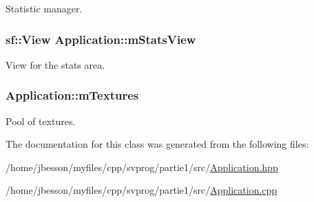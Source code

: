 Statistic manager. 

\hypertarget{class_application_a823c6ca5d9d397554b397810c940355a}{
\subsubsection[{m\-Stats\-View}]{\setlength{\rightskip}{0pt plus 5cm}sf\-::\-View Application\-::m\-Stats\-View\hspace{0.3cm}{\ttfamily [private]}}}\label{class_application_a823c6ca5d9d397554b397810c940355a}


View for the stats area. 

\hypertarget{class_application_adee1221b74e94ac0fe94b3c99f52e03a}{
\subsubsection[{m\-Textures}]{ Application\-::m\-Textures\hspace{0.3cm}{\ttfamily [private]}}}\label{class_application_adee1221b74e94ac0fe94b3c99f52e03a}


Pool of textures. 



The documentation for this class was generated from the following files\-:\begin{DoxyCompactItemize}
\item 
/home/jbesson/myfiles/cpp/svprog/partie1/src/\hyperlink{_application_8hpp}{Application.\-hpp}\item 
/home/jbesson/myfiles/cpp/svprog/partie1/src/\hyperlink{_application_8cpp}{Application.\-cpp}\end{DoxyCompactItemize}
